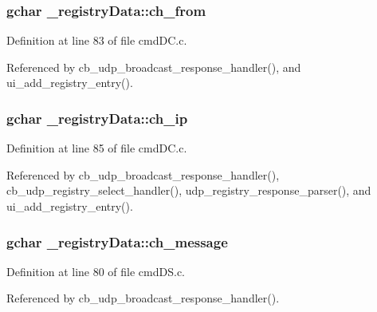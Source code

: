 \subsubsection[{ch\+\_\+from}]{\setlength{\rightskip}{0pt plus 5cm}gchar \+\_\+registry\+Data\+::ch\+\_\+from}\label{struct__registry_data_a5fac46820690525a9d8b3f0185bca587}


Definition at line 83 of file cmd\+D\+C.\+c.



Referenced by cb\+\_\+udp\+\_\+broadcast\+\_\+response\+\_\+handler(), and ui\+\_\+add\+\_\+registry\+\_\+entry().

\hypertarget{struct__registry_data_a814e064e77a6aac5866c88cb51acd971}{}
\subsubsection[{ch\+\_\+ip}]{\setlength{\rightskip}{0pt plus 5cm}gchar \+\_\+registry\+Data\+::ch\+\_\+ip}\label{struct__registry_data_a814e064e77a6aac5866c88cb51acd971}


Definition at line 85 of file cmd\+D\+C.\+c.



Referenced by cb\+\_\+udp\+\_\+broadcast\+\_\+response\+\_\+handler(), cb\+\_\+udp\+\_\+registry\+\_\+select\+\_\+handler(), udp\+\_\+registry\+\_\+response\+\_\+parser(), and ui\+\_\+add\+\_\+registry\+\_\+entry().

\hypertarget{struct__registry_data_ae9b0c1e6f13d980dcc7515def6b20b5e}{}
\subsubsection[{ch\+\_\+message}]{\setlength{\rightskip}{0pt plus 5cm}gchar \+\_\+registry\+Data\+::ch\+\_\+message}\label{struct__registry_data_ae9b0c1e6f13d980dcc7515def6b20b5e}


Definition at line 80 of file cmd\+D\+S.\+c.



Referenced by cb\+\_\+udp\+\_\+broadcast\+\_\+response\+\_\+handler().

\hypertarget{struct__registry_data_a4764e2a72c3ba9177b6c4803cfa03f72}{}
